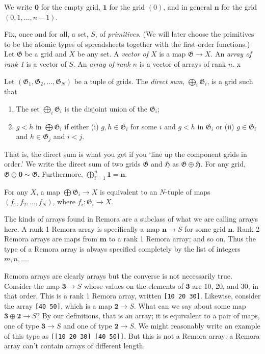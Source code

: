 \documentclass[11pt]{article}
\newcommand{\gr}[1]{\mathfrak{#1}}
\newcommand{\GG}{\gr{G}}
\newcommand{\void}{\mathbf{0}}
\begin{document}
We write \(\void\) for the empty grid, \(\mathbf{1}\) for the grid \((0)\), and in
general \(\mathbf{n}\) for the grid \((0, 1, \dotsc, n-1)\). 

Fix, once and for all, a set, \(S\), of \emph{primitives}. (We will later choose
the primitives to be the atomic types of spreadsheets together with the
first-order functions.) Let $\GG$ be a grid and $X$ be any set. A \emph{vector
of $X$} is a map $\GG \to X$. An \emph{array of rank 1} is a vector of $S$. An
\emph{array of rank $n$} is a vector of arrays of rank $n$. x

Let \((\GG_1, \GG_2, \dots, \GG_N)\) be a tuple of grids. The \emph{direct sum},
\(\bigoplus_i \GG_i\), is a grid such that
\begin{enumerate}
\item The set \(\bigoplus_i \GG_i\) is the disjoint union of the \(\GG_i\);
\item \(g<h\) in \(\bigoplus \GG_i\) if either (i) \(g, h\in \GG_i\) for some \(i\) and \(g<h\)
in \(\GG_i\) or (ii) \(g\in\GG_i\) and \(h\in\GG_j\) and \(i < j\).
\end{enumerate}
That is, the direct sum is what you get if you `line up the component grids in
order.' We write the direct sum of two grids \(\gr{G}\) and \(\gr{H}\) as \(\gr{G}\oplus
\gr{H}\). For any grid, \(\GG\oplus\void \sim \GG\). Furthermore,
\(\bigoplus_{i=1}^n \mathbf{1} = \mathbf{n}\). 

For any \(X\), a map \(\bigoplus \GG_i\to X\) is equivalent to an \(N\)-tuple of maps \((f_1, f_2,
\dots, f_N)\), where \(f_i : \GG_i\to X\).

The kinds of arrays found in Remora are a subclass of what we are calling arrays
here. A rank 1 Remora array is specifically a map \(\mathbf{n}\to S\) for some
grid \(\mathbf{n}\). Rank 2 Remora arrays are maps from \(\mathbf{m}\) to a rank 1
Remora array; and so on. Thus the type of a Remora array is always specified
completely by the list of integers \(m, n, \dotsc\).

Remora arrays are clearly arrays but the converse is not necessarily
true. Consider the map \(\mathbf{3}\to S\) whose values on the elements of
\(\mathbf{3}\) are 10, 20, and 30, in that order. This is a rank 1 Remora array,
written \texttt{[10 20 30]}. Likewise, consider the array \texttt{[40 50]}, which is a map
\(\mathbf{2}\to S\). What can we say about some map \(\mathbf{3}\oplus\mathbf{2}\to
S\)? By our definitions, that is an array; it is equivalent to a pair of maps,
one of type \(\mathbf{3}\to S\) and one of type \(\mathbf{2}\to S\). We might
reasonably write an example of this type as \texttt{[[10 20 30] [40 50]]}. But this is
not a Remora array: a Remora array can't contain arrays of different length.
\end{document}
